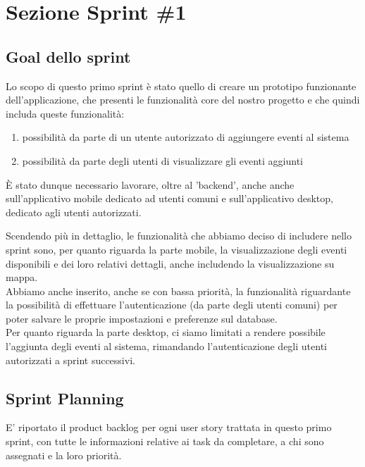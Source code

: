 \documentclass{article}
\begin{document}
\clearpage

\section{Sezione Sprint \#1}

\subsection{Goal dello sprint}
Lo scopo di questo primo sprint è stato quello di creare un prototipo funzionante dell'applicazione, che presenti le funzionalità core del nostro progetto e che quindi includa queste funzionalità:
\begin{enumerate}
\item possibilità da parte di un utente autorizzato di aggiungere eventi al sistema
\item possibilità da parte degli utenti di visualizzare gli eventi aggiunti
\end{enumerate}
È stato dunque necessario lavorare, oltre al 'backend', anche anche sull'applicativo mobile dedicato ad utenti comuni e sull'applicativo desktop, dedicato agli utenti autorizzati.

Scendendo più in dettaglio, le funzionalità che abbiamo deciso di includere nello sprint sono, per quanto riguarda la parte mobile, la visualizzazione degli eventi disponibili e dei loro relativi dettagli, anche includendo la visualizzazione su mappa.\\
Abbiamo anche inserito, anche se con bassa priorità, la funzionalità riguardante la possibilità di effettuare l'autenticazione (da parte degli utenti comuni) per poter salvare le proprie impostazioni e preferenze sul database.\\
Per quanto riguarda la parte desktop, ci siamo limitati a rendere possibile l'aggiunta degli eventi al sistema, rimandando l'autenticazione degli utenti autorizzati a sprint successivi.

\subsection{Sprint Planning}
E' riportato il product backlog per ogni user story trattata in questo primo sprint, con tutte le informazioni relative ai task da completare, a chi sono assegnati e la loro priorità.\\
\end{document}
